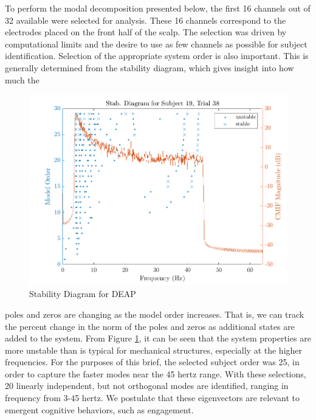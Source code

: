 To perform the modal decomposition presented below, the first 16 channels out of 32 available were selected for analysis. These 16 channels correspond to the electrodes placed on the front half of the scalp. The selection was driven by computational limits and the desire to use as few channels as possible for subject identification. Selection of the appropriate system order is also important. This is generally determined from the stability diagram, which gives insight into how much the 
\begin{figure}
\centering
\includegraphics[scale=0.6]{../../../figures/S19T38.png}  
\caption{Stability Diagram for DEAP}
\label{fig:stabdiag}
\end{figure}
poles and zeros are changing as the model order increases. That is, we can track the percent change in the norm of the poles and zeros as additional states are added to the system. From Figure \ref{fig:stabdiag}, it can be seen that the system properties are more unstable than is typical for mechanical structures, especially at the higher frequencies. For the purposes of this brief, the selected subject order was 25, in order to capture the faster modes near the 45 hertz range. With these selections, 20 linearly independent, but not orthogonal modes are identified, ranging in frequency from 3-45 hertz. We postulate that these eigenvectors are relevant to emergent cognitive behaviors, such as engagement.   


